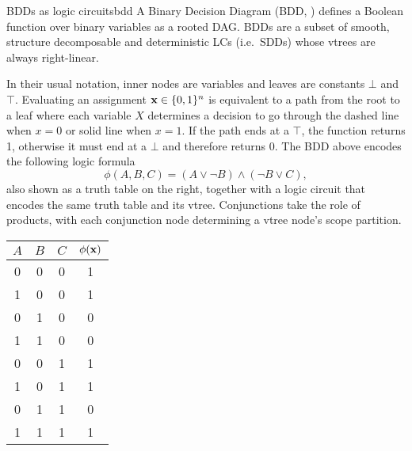 \begin{example}[sidebyside,lefthand width=0.55\textwidth]{BDDs as logic circuits}{bdd}
  A Binary Decision Diagram (BDD, \cite{bryant86}) defines a Boolean function over binary variables
  as a rooted DAG. BDDs are a subset of smooth, structure decomposable and deterministic LCs (i.e.\
  SDDs) whose vtrees are always right-linear.
  \begin{center}
  \end{center}
  In their usual notation, inner nodes are variables and leaves are constants $\bot$ and $\top$.
  Evaluating an assignment $\mathbf{x}\in\{0,1\}^n$ is equivalent to a path from the root to a
  leaf where each variable $X$ determines a decision to go through the dashed line when $x=0$ or
  solid line when $x=1$. If the path ends at a $\top$, the function returns 1, otherwise it must
  end at a $\bot$ and therefore returns 0. The BDD above encodes the following logic formula
  \begin{equation*}
    \phi(A,B,C)=(A\vee\neg B)\wedge(\neg B\vee C),
  \end{equation*}
  also shown as a truth table on the right, together with a logic circuit that encodes the same
  truth table and its vtree. Conjunctions take the role of products, with each conjunction node
  determining a vtree node's scope partition.
  \tcblower
  \small%
  \begin{center}
    \begin{tabular}{ccc|c}
      \hline
      $A$ & $B$ & $C$ & $\phi(\mathbf{x})$\\
      \hline
      0 & 0 & 0 & 1\\
      1 & 0 & 0 & 1\\
      0 & 1 & 0 & 0\\
      1 & 1 & 0 & 0\\
      0 & 0 & 1 & 1\\
      1 & 0 & 1 & 1\\
      0 & 1 & 1 & 0\\
      1 & 1 & 1 & 1\\
      \hline
    \end{tabular}


\end{center}
\end{example}
